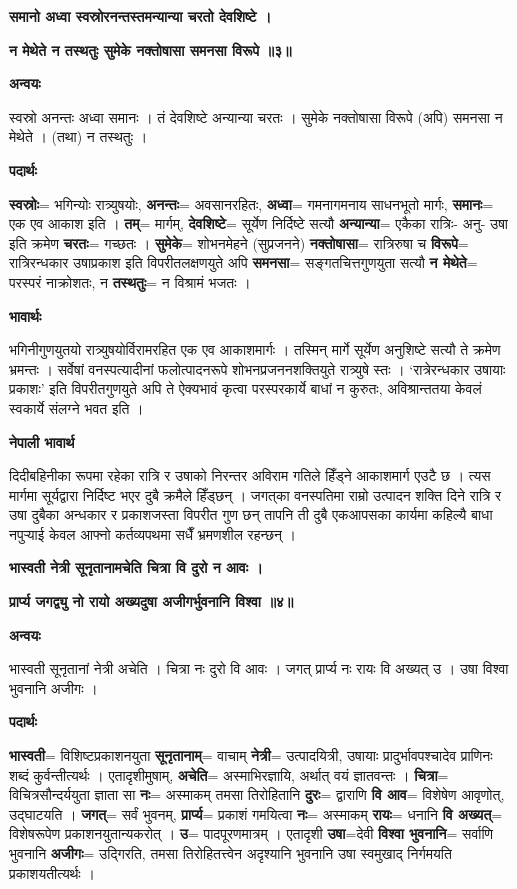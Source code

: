 \documentclass[11pt, a5paper]{article}
\begin{document}
\textbf{समानो अध्वा स्वस्रोरनन्तस्तमन्यान्या चरतो देवशिष्टे ।}

\textbf{न मेथेते न तस्थतुः सुमेके नक्तोषासा समनसा विरूपे ॥३॥}

\textbf{अन्वयः}

स्वस्रो अनन्तः अध्वा समानः । तं देवशिष्टे अन्यान्या चरतः । सुमेके नक्तोषासा विरूपे (अपि) समनसा न मेथेते । (तथा) न तस्थतुः ।

\textbf{पदार्थः}

\textbf{स्वस्रोः}= भगिन्योः  रात्र्युषयोः, \textbf{अनन्तः}= अवसानरहितः, \textbf{अध्वा}= गमनागमनाय साधनभूतो मार्गः, \textbf{समानः}= एक एव आकाश इति । \textbf{तम्}= मार्गम्, \textbf{देवशिष्टे}= सूर्येण निर्दिष्टे सत्यौ \textbf{अन्यान्या}= एकैका रात्रिः- अनु- उषा इति क्रमेण \textbf{चरतः}= गच्छतः । \textbf{सुमेके}= शोभनमेहने (सुप्रजनने) \textbf{नक्तोषासा}= रात्रिरुषा च \textbf{विरूपे}= रात्रिरन्धकार उषाप्रकाश इति विपरीतलक्षणयुते अपि \textbf{समनसा}= सङ्गतचित्तगुणयुता सत्यौ \textbf{न मेथेते}= परस्परं नाक्रोशतः, न \textbf{तस्थतुः}= न विश्रामं भजतः ।

\textbf{भावार्थः}

भगिनीगुणयुतयो रात्र्युषयोर्विरामरहित एक एव आकाशमार्गः । तस्मिन् मार्गे सूर्येण अनुशिष्टे सत्यौ ते क्रमेण भ्रमन्तः । सर्वेषां वनस्पत्यादीनां फलोत्पादनरूपे शोभनप्रजननशक्तियुते रात्र्युषे स्तः । ‘रात्रेरन्धकार उषायाः प्रकाशः’ इति विपरीतगुणयुते अपि ते ऐक्यभावं कृत्वा परस्परकार्ये बाधां न कुरुतः, अविश्रान्ततया केवलं स्वकार्ये संलग्ने भवत इति ।

\textbf{नेपाली भावार्थ}

दिदीबहिनीका रूपमा रहेका रात्रि र उषाको निरन्तर अविराम गतिले हिँड्ने आकाशमार्ग एउटै छ । त्यस मार्गमा सूर्यद्वारा निर्दिष्ट भएर दुबै क्रमैले हिँड्छन् । जगत्‌का वनस्पतिमा राम्रो उत्पादन शक्ति दिने रात्रि र उषा दुबैका अन्धकार र प्रकाशजस्ता विपरीत गुण छन् तापनि ती दुबै एकआपसका कार्यमा कहिल्यै बाधा नपुर्‍याई केवल आफ्नो कर्तव्यपथमा सधैँ भ्रमणशील रहन्छन् ।

\textbf{भास्वती नेत्री सूनृतानामचेति चित्रा वि दुरो न आवः ।}

\textbf{प्रार्प्य जगद्व्यु नो रायो अख्यदुषा अजीगर्भुवनानि विश्वा ॥४॥}

\textbf{अन्वयः}

भास्वती सूनृतानां नेत्री अचेति । चित्रा नः दुरो वि आवः । जगत् प्रार्प्य नः रायः वि अख्यत् उ । उषा विश्वा भुवनानि अजीगः ।

\textbf{पदार्थः}

\textbf{भास्वती}= विशिष्टप्रकाशनयुता \textbf{सूनृतानाम्}= वाचाम् \textbf{नेत्री}= उत्पादयित्री, उषायाः प्रादुर्भावपश्चादेव प्राणिनः शब्दं कुर्वन्तीत्यर्थः । एतादृशीमुषाम्, \textbf{अचेति}= अस्माभिरज्ञायि, अर्थात् वयं ज्ञातवन्तः । \textbf{चित्रा}= विचित्रसौन्दर्ययुता ज्ञाता सा \textbf{नः}= अस्माकम्  तमसा तिरोहितानि \textbf{दुरः}= द्वाराणि \textbf{वि आव}= विशेषेण आवृणोत्, उद्‌घाटयति । \textbf{जगत्}= सर्वं भुवनम्, \textbf{प्रार्प्य}= प्रकाशं गमयित्वा \textbf{नः}= अस्माकम् \textbf{रायः}= धनानि \textbf{वि अख्यत्}= विशेषरूपेण प्रकाशनयुतान्यकरोत् । \textbf{उ}= पादपूरणमात्रम् । एतादृशी \textbf{उषा}=देवी \textbf{विश्वा‍‍‍ भुवनानि}= सर्वाणि भुवनानि \textbf{अजीगः}= उद्गिरति, तमसा तिरोहितत्त्वेन अदृश्यानि भुवनानि उषा स्वमुखाद् निर्गमयति प्रकाशयतीत्यर्थः ।
\end{document}
